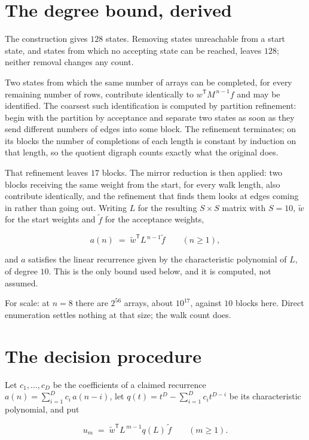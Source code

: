 \documentclass[11pt]{article}
\theoremstyle{definition}
\begin{document}
\section{The degree bound, derived}

The construction gives $128$ states. Removing states unreachable from a start state, and states from which no accepting state can be reached, leaves $128$; neither removal changes any count.

Two states from which the same number of arrays can be completed, for every remaining number of rows, contribute identically to $w^{\mathsf T}M^{\,n-1}f$ and may be identified. The coarsest such identification is computed by partition refinement: begin with the partition by acceptance and separate two states as soon as they send different numbers of edges into some block. The refinement terminates; on its blocks the number of completions of each length is constant by induction on that length, so the quotient digraph counts exactly what the original does.

That refinement leaves $17$ blocks. The mirror reduction is then applied: two blocks receiving the same weight from the start, for every walk length, also contribute identically, and the refinement that finds them looks at edges coming in rather than going out. Writing $L$ for the resulting $S \times S$ matrix with $S = 10$, $\tilde w$ for the start weights and $\tilde f$ for the acceptance weights,

\[a(n) \;=\; \tilde w^{\mathsf T} L^{\,n-1} \tilde f \qquad (n \ge 1),\]

and $a$ satisfies the linear recurrence given by the characteristic polynomial of $L$, of degree $10$. This is the only bound used below, and it is computed, not assumed.

For scale: at $n = 8$ there are $2^{56}$ arrays, about $10^{17}$, against $10$ blocks here. Direct enumeration settles nothing at that size; the walk count does.

\section{The decision procedure}

Let $c_1,\dots,c_D$ be the coefficients of a claimed recurrence $a(n) = \sum_{i=1}^{D} c_i\,a(n-i)$, let $q(t) = t^{D} - \sum_{i=1}^{D} c_i t^{D-i}$ be its characteristic polynomial, and put

\[u_m \;=\; \tilde w^{\mathsf T} L^{\,m-1} q(L)\,\tilde f \qquad (m \ge 1).\]
\end{document}
